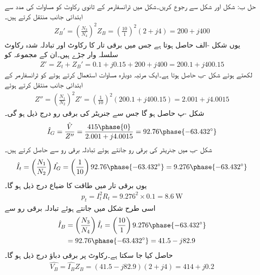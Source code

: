 حل ب:\quad
شکل  اور شکل   سے رجوع کریں۔شکل   میں ٹرانسفارمر  کے ثانوی  رکاوٹ کو مساوات   کی مدد سے  ابتدائی جانب منتقل کرتے ہیں۔
\begin{align*}
Z_B'=\left(\frac{N_3}{N_4} \right)^2 Z_B=\left(\frac{10}{1} \right)^2 \left(2+j 4 \right)=200+j 400
\end{align*}
یوں شکل -الف حاصل ہوتا ہے جس  میں  برقی تار کا رکاوٹ اور  تبادلہ شدہ رکاوٹ سلسلہ وار جڑے ہیں۔ان کے مجموعہ  کو  
\begin{align*}
Z'=Z_t+Z_B'=0.1+j 0.15+200+j 400=200.1+j400.15
\end{align*}
لکھتے ہوئے شکل -ب حاصل ہوتا ہے۔ایک مرتبہ دوبارہ مساوات   استعمال کرتے ہوئے  کو ٹرانسفارمر کے ابتدائی جانب منتقل کرتے ہوئے
\begin{align*}
Z''=\left(\frac{N_1}{N_2} \right)^2 Z'=\left(\frac{1}{10} \right)^2 \left(200.1+j400.15 \right)=2.001+j4.0015
\end{align*}
شکل -پ حاصل ہو گا جس سے جنریٹر کی برقی رو درج ذیل ہو گی۔
\begin{align*}
\hat{I}_G=\frac{\hat{V}}{Z''}=\frac{415\phase{0}}{2.001+j4.0015}=92.76\phase{-63.432^{\circ}}
\end{align*}
شکل -ب  میں جنریٹر کی برقی رو جانتے ہوئے  تبادلہ برقی رو سے  حاصل کرتے ہیں۔
\begin{align*}
\hat{I}_t=\left(\frac{N_1}{N_2} \right) \hat{I_G}=\left(\frac{1}{10}\right) 92.76\phase{-63.432^{\circ}}=9.276\phase{-63.432^{\circ}}
\end{align*}
یوں برقی تار میں طاقت کا ضیاع درج ذیل ہو گا۔
\begin{align*}
p_t=I_t^2 R_t=9.276^2  \times 0.1=\SI{8.6}{\watt}
\end{align*}
اسی طرح شکل   میں   جانتے ہوئے تبادلہ برقی رو سے
\begin{align*}
\hat{I}_B&=\left(\frac{N_3}{N_4}\right) \hat{I_t}=\left(\frac{10}{1}\right) 9.276\phase{-63.432^{\circ}}\\
&=92.76\phase{-63.432^{\circ}}=41.5-j 82.9
\end{align*}
حاصل کیا جا سکتا ہے۔رکاوٹ پر برقی دباؤ درج ذیل ہو گا۔
\begin{align*}
\hat{V_B}=\hat{I_B} Z_B=\left(41.5-j 82.9 \right) \left(2+j 4 \right)=414+j 0.2
\end{align*}
